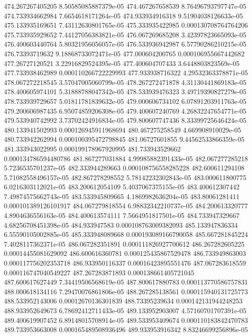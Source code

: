 {474.267267405205 8.50585085887379e-05
474.467267658539 8.76496793797747e-05
474.733934662984 7.6654618171264e-05
474.933934916318 9.51904038126633e-05
475.133935169651 7.43112630801765e-05
475.333935422985 0.000130708764764206
475.733935929652 7.44127056383821e-05
476.067269685208 3.42397823665093e-05
476.400603440764 5.80321956056057e-05
476.533936942987 6.57790286210215e-05
476.73393719632 9.18868733072471e-05
477.000604200765 0.000106955667442682
477.26727120521 3.22916829524395e-05
477.400604707433 3.6448803823569e-05
477.733938462989 0.000110266722229993
477.933938716322 4.29532363378871e-05
478.067272218545 3.57047005060799e-05
478.267272471878 4.31130441869183e-05
478.400605974101 5.31888788047342e-05
478.533939476323 3.49719390827279e-05
478.733939729657 5.01811781839632e-05
479.000606734102 6.07891203911763e-05
479.200606987435 6.95074859206308e-05
479.400607240769 4.26832247654771e-05
479.533940742992 3.73702424916834e-05
479.800607747436 8.33399725646424e-05
480.133941502993 0.000126945911968694
480.467275258549 4.669908910029e-05
480.733942262994 0.000100395472798845
481.06727601855 9.44562533866359e-05
481.333943022995 0.000199178967920995
481.733943529662 0.000134786594480786
481.867277031884 4.99985882391433e-05
482.067277285218 5.7236535701237e-05
482.333944289663 0.000108756558285228
482.600611294108 5.71082558496157e-05
482.867278298552 5.78142232302843e-05
483.000611800775 6.0216303112021e-05
483.200612054109 5.4037067375155e-05
483.400612307442 7.49874575662743e-05
483.533945809665 4.1869982636204e-05
483.80061281411 0.000101389126101917
484.067279818554 6.98832342210737e-05
484.200613320777 4.8904636556163e-05
484.400613574111 7.5664951817501e-05
484.733947329667 4.68256708451398e-05
484.933947583 0.000108763009382093
485.133947836334 6.55590105002885e-05
485.333948089668 0.000193089166790058
485.667281845224 7.4028117362371e-05
486.067282351891 0.000111826927700612
486.267282605225 0.00014455081629092
486.600616360781 0.000125435867529478
486.733949863003 0.000117756202353718
486.933950116337 0.00016423895551476
487.067283618559 0.000116747040549227
487.267283871893 0.000138661405721045
487.600617627449 7.34419506568619e-05
487.800617880783 0.000113770586757831
488.000618134116 7.29470076861806e-05
488.267285138561 0.000115940131725773
488.533952143006 0.00012670136301839
488.73395239634 0.000142131944248253
488.933952649673 6.78692412711433e-05
489.133952903007 4.57160701707391e-05
489.400619907452 6.89148015708914e-05
489.533953409674 0.000110183842470783
489.733953663008 0.000165489508936496
489.933953916342 8.83246699256896e-05
}
